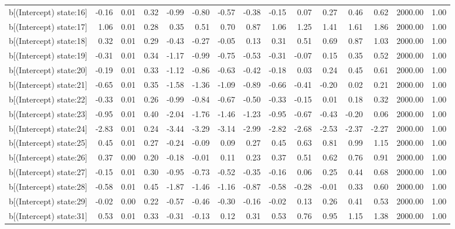 \begin{table}[ht]
\begin{tabular}{rrrrrrrrrrrrrrr}
  b[(Intercept) state:16] & -0.16 & 0.01 & 0.32 & -0.99 & -0.80 & -0.57 & -0.38 & -0.15 & 0.07 & 0.27 & 0.46 & 0.62 & 2000.00 & 1.00 \\ 
  b[(Intercept) state:17] & 1.06 & 0.01 & 0.28 & 0.35 & 0.51 & 0.70 & 0.87 & 1.06 & 1.25 & 1.41 & 1.61 & 1.86 & 2000.00 & 1.00 \\ 
  b[(Intercept) state:18] & 0.32 & 0.01 & 0.29 & -0.43 & -0.27 & -0.05 & 0.13 & 0.31 & 0.51 & 0.69 & 0.87 & 1.03 & 2000.00 & 1.00 \\ 
  b[(Intercept) state:19] & -0.31 & 0.01 & 0.34 & -1.17 & -0.99 & -0.75 & -0.53 & -0.31 & -0.07 & 0.15 & 0.35 & 0.52 & 2000.00 & 1.00 \\ 
  b[(Intercept) state:20] & -0.19 & 0.01 & 0.33 & -1.12 & -0.86 & -0.63 & -0.42 & -0.18 & 0.03 & 0.24 & 0.45 & 0.61 & 2000.00 & 1.00 \\ 
  b[(Intercept) state:21] & -0.65 & 0.01 & 0.35 & -1.58 & -1.36 & -1.09 & -0.89 & -0.66 & -0.41 & -0.20 & 0.02 & 0.21 & 2000.00 & 1.00 \\ 
  b[(Intercept) state:22] & -0.33 & 0.01 & 0.26 & -0.99 & -0.84 & -0.67 & -0.50 & -0.33 & -0.15 & 0.01 & 0.18 & 0.32 & 2000.00 & 1.00 \\ 
  b[(Intercept) state:23] & -0.95 & 0.01 & 0.40 & -2.04 & -1.76 & -1.46 & -1.23 & -0.95 & -0.67 & -0.43 & -0.20 & 0.06 & 2000.00 & 1.00 \\ 
  b[(Intercept) state:24] & -2.83 & 0.01 & 0.24 & -3.44 & -3.29 & -3.14 & -2.99 & -2.82 & -2.68 & -2.53 & -2.37 & -2.27 & 2000.00 & 1.00 \\ 
  b[(Intercept) state:25] & 0.45 & 0.01 & 0.27 & -0.24 & -0.09 & 0.09 & 0.27 & 0.45 & 0.63 & 0.81 & 0.99 & 1.15 & 2000.00 & 1.00 \\ 
  b[(Intercept) state:26] & 0.37 & 0.00 & 0.20 & -0.18 & -0.01 & 0.11 & 0.23 & 0.37 & 0.51 & 0.62 & 0.76 & 0.91 & 2000.00 & 1.00 \\ 
  b[(Intercept) state:27] & -0.15 & 0.01 & 0.30 & -0.95 & -0.73 & -0.52 & -0.35 & -0.16 & 0.06 & 0.25 & 0.44 & 0.68 & 2000.00 & 1.00 \\ 
  b[(Intercept) state:28] & -0.58 & 0.01 & 0.45 & -1.87 & -1.46 & -1.16 & -0.87 & -0.58 & -0.28 & -0.01 & 0.33 & 0.60 & 2000.00 & 1.00 \\ 
  b[(Intercept) state:29] & -0.02 & 0.00 & 0.22 & -0.57 & -0.46 & -0.30 & -0.16 & -0.02 & 0.13 & 0.26 & 0.41 & 0.53 & 2000.00 & 1.00 \\ 
  b[(Intercept) state:31] & 0.53 & 0.01 & 0.33 & -0.31 & -0.13 & 0.12 & 0.31 & 0.53 & 0.76 & 0.95 & 1.15 & 1.38 & 2000.00 & 1.00 \\ 

\end{tabular}
\end{table}

